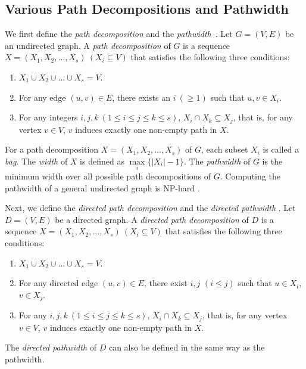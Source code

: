 \documentclass[runningheads]{llncs}
\theoremstyle{plain}
\theoremstyle{definition}
\begin{document}
\subsection{Various Path Decompositions and Pathwidth}
We first define the \emph{path decomposition} and the \emph{pathwidth}~\cite{art1}. Let $G = (V, E)$ be an undirected graph. A \emph{path decomposition} of $G$ is a sequence $X = (X_1, X_2, \dots, X_s) ~(X_i \subseteq V)$ that satisfies the following three conditions:
\begin{enumerate}
    \item $X_1 \cup X_2 \cup \dots \cup X_s = V$.
    \item For any edge $(u, v) \in E$, there exists an $i \ (\geq 1)$ such that $u, v \in X_i$.
    \item For any integers $i, j, k\ (1 \leq i \leq j \leq k \leq s)$, $X_i \cap X_k \subseteq X_j$, that is, for any vertex $v \in V$, $v$ induces exactly one non-empty path in $X$.
\end{enumerate}

For a path decomposition $X = (X_1, X_2, \dots, X_s)$ of $G$, each subset $X_i$ is called a \emph{bag}. The \emph{width} of $X$ is defined as $\underset{i}{\max} \{ |X_i| - 1 \}$. The \emph{pathwidth} of $G$ is the minimum width over all possible path decompositions of $G$. Computing the pathwidth of a general undirected graph is NP-hard \cite{art3}.

Next, we define the \emph{directed path decomposition} and the \emph{directed pathwidth} \cite{art9}. Let $D = (V, E)$ be a directed graph. A \emph{directed path decomposition} of $D$ is a sequence $X = (X_1, X_2, \dots, X_s) ~(X_i \subseteq V)$ that satisfies the following three conditions:
\begin{enumerate}
    \item $X_1 \cup X_2 \cup \dots \cup X_s = V$.
    \item For any directed edge $(u, v) \in E$, there exist $i, j$ $(i \leq j)$ such that $u \in X_i$, $v \in X_j$.
    \item For any $i, j, k\ (1 \leq i \leq j \leq k \leq s)$, $X_i \cap X_k \subseteq X_j$, that is, for any vertex $v \in V$, $v$ induces exactly one non-empty path in $X$.
\end{enumerate}

The \emph{directed pathwidth} of $D$ can also be defined in the same way as the pathwidth.
\end{document}

